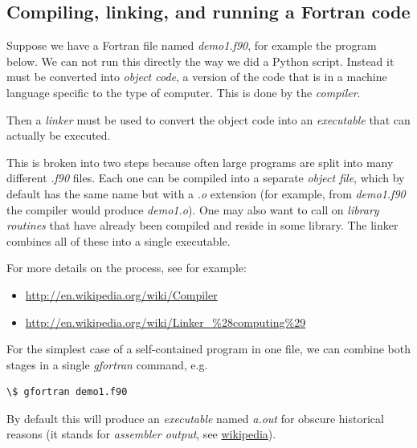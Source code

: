 \documentclass[letterpaper,10pt,english]{sphinxmanual}
\begin{document}
\subsection{Compiling, linking, and running a Fortran code}
\label{fortran:fortran-compiling}\label{fortran:compiling-linking-and-running-a-fortran-code}
Suppose we have a Fortran file named \emph{demo1.f90}, for example the
program below.  We can not run this directly the way we did a Python
script.  Instead it must be converted into \emph{object code}, a version
of the code that is in a machine language specific to the type of
computer.  This is done by the \emph{compiler}.

Then a \emph{linker} must be used to convert the object code into an
\emph{executable} that can actually be executed.

This is broken into two steps because often large programs are split
into many different \emph{.f90} files.  Each one can be compiled into a
separate \emph{object file}, which by default has the same name but with a
\emph{.o} extension (for example, from \emph{demo1.f90} the compiler would
produce \emph{demo1.o}).  One may also want to call on \emph{library routines} that
have already been compiled and reside in some library.  The linker
combines all of these into a single executable.

For more details on the process, see for example:
\begin{itemize}
\item {} 
\href{http://en.wikipedia.org/wiki/Compiler}{http://en.wikipedia.org/wiki/Compiler}

\item {} 
\href{http://en.wikipedia.org/wiki/Linker\_\%28computing\%29}{http://en.wikipedia.org/wiki/Linker\_\%28computing\%29}

\end{itemize}

For the simplest case of a self-contained program in one file, we can
combine both stages in a single \emph{gfortran} command, e.g.

\begin{Verbatim}[commandchars=\\\{\}]
\$ gfortran demo1.f90
\end{Verbatim}

By default this will produce an \emph{executable} named \emph{a.out} for
obscure historical reasons (it stands for \emph{assembler output},
see \href{http://en.wikipedia.org/wiki/A.out}{wikipedia}).
\end{document}
